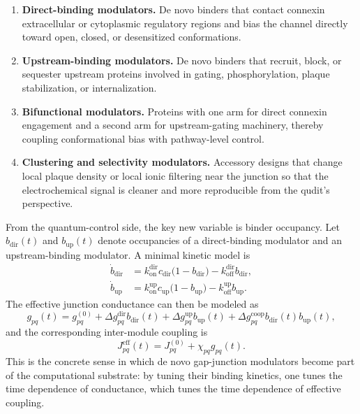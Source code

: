 \documentclass[11pt]{report}
\theoremstyle{definition}
\begin{document}
\begin{enumerate}[leftmargin=2em]
\item \textbf{Direct-binding modulators.} De novo binders that contact connexin extracellular or cytoplasmic regulatory regions and bias the channel directly toward open, closed, or desensitized conformations.
\item \textbf{Upstream-binding modulators.} De novo binders that recruit, block, or sequester upstream proteins involved in gating, phosphorylation, plaque stabilization, or internalization.
\item \textbf{Bifunctional modulators.} Proteins with one arm for direct connexin engagement and a second arm for upstream-gating machinery, thereby coupling conformational bias with pathway-level control.
\item \textbf{Clustering and selectivity modulators.} Accessory designs that change local plaque density or local ionic filtering near the junction so that the electrochemical signal is cleaner and more reproducible from the qudit's perspective.
\end{enumerate}

From the quantum-control side, the key new variable is binder occupancy. Let $b_{\mathrm{dir}}(t)$ and $b_{\mathrm{up}}(t)$ denote occupancies of a direct-binding modulator and an upstream-binding modulator. A minimal kinetic model is
\begin{align}
\dot{b}_{\mathrm{dir}} &= k_{\mathrm{on}}^{\mathrm{dir}} c_{\mathrm{dir}} \big(1-b_{\mathrm{dir}}\big) - k_{\mathrm{off}}^{\mathrm{dir}} b_{\mathrm{dir}},\\
\dot{b}_{\mathrm{up}} &= k_{\mathrm{on}}^{\mathrm{up}} c_{\mathrm{up}} \big(1-b_{\mathrm{up}}\big) - k_{\mathrm{off}}^{\mathrm{up}} b_{\mathrm{up}}.
\end{align}
The effective junction conductance can then be modeled as
\begin{equation}
g_{pq}(t)
=
g_{pq}^{(0)}
+ \Delta g_{pq}^{\mathrm{dir}} b_{\mathrm{dir}}(t)
+ \Delta g_{pq}^{\mathrm{up}} b_{\mathrm{up}}(t)
+ \Delta g_{pq}^{\mathrm{coop}} b_{\mathrm{dir}}(t)b_{\mathrm{up}}(t),
\end{equation}
and the corresponding inter-module coupling is
\begin{equation}
J_{pq}^{\mathrm{eff}}(t) = J_{pq}^{(0)} + \chi_{pq} g_{pq}(t).
\end{equation}
This is the concrete sense in which de novo gap-junction modulators become part of the computational substrate: by tuning their binding kinetics, one tunes the time dependence of conductance, which tunes the time dependence of effective coupling.
\end{document}
